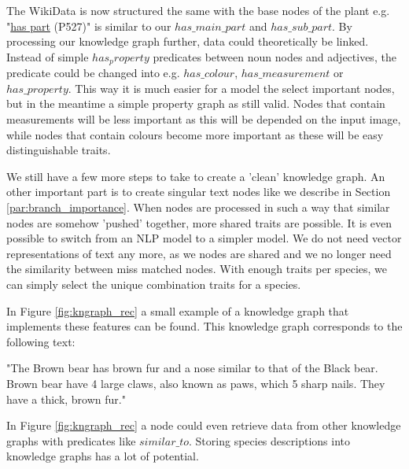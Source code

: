 \documentclass[a4paper, 12pt, oneside]{book} %
\begin{document}
The WikiData is now structured the same with the base nodes of the plant e.g. "\href{https://www.wikidata.org/wiki/Property:P527}{has part} (P527)"  is similar to our $has\_main\_part$ and $has\_sub\_part$.
By processing our knowledge graph further, data could theoretically be linked.
Instead of simple $has_property$ predicates between noun nodes and adjectives, the predicate could be changed into e.g. $has\_colour$, $has\_measurement$ or $has\_property$.
This way it is much easier for a model the select important nodes, but in the meantime a simple property graph as still valid.
Nodes that contain measurements will be less important as this will be depended on the input image, while nodes that contain colours become more important as these will be easy distinguishable traits.

We still have a few more steps to take to create a 'clean' knowledge graph.
An other important part is to create singular text nodes like we describe in Section \ref{par:branch_importance}.
When nodes are processed in such a way that similar nodes are somehow 'pushed' together, more shared traits are possible.
It is even possible to switch from an NLP model to a simpler model.
We do not need vector representations of text any more, as we nodes are shared and we no longer need the similarity between miss matched nodes.
With enough traits per species, we can simply select the unique combination traits for a species.

In Figure \ref{fig:kngraph_rec} a small example of a knowledge graph that implements these features can be found.
This knowledge graph corresponds to the following text:
\newline

\noindent
"The Brown bear has brown fur and a nose similar to that of the Black bear. Brown bear have 4 large claws, also known as paws, which 5 sharp nails. They have a thick, brown fur."
\newline

\noindent
In Figure \ref{fig:kngraph_rec} a node could even retrieve data from other knowledge graphs with predicates like $similar\_to$.
Storing species descriptions into knowledge graphs has a lot of potential.
\end{document}
